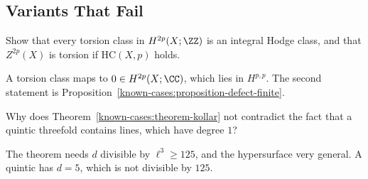 \subsection{Variants That Fail}\label{known-cases:subsection-exercises-failures}

\begin{exercise}\label{known-cases:exercise-torsion-hodge}
Show that every torsion class in $H^{2p}(X; \ZZ)$ is an integral Hodge class, and that $Z^{2p}(X)$ is torsion if $\mathrm{HC}(X, p)$ holds.
\end{exercise}

\begin{solution}
A torsion class maps to $0 \in H^{2p}(X; \CC)$, which lies in $H^{p,p}$. The second statement is Proposition~\ref{known-cases:proposition-defect-finite}.
\end{solution}

\begin{exercise}\label{known-cases:exercise-kollar-quintic}
Why does Theorem~\ref{known-cases:theorem-kollar} not contradict the fact that a quintic threefold contains lines, which have degree $1$?
\end{exercise}

\begin{solution}
The theorem needs $d$ divisible by $\ell^3 \geq 125$, and the hypersurface very general. A quintic has $d = 5$, which is not divisible by $125$.
\end{solution}
